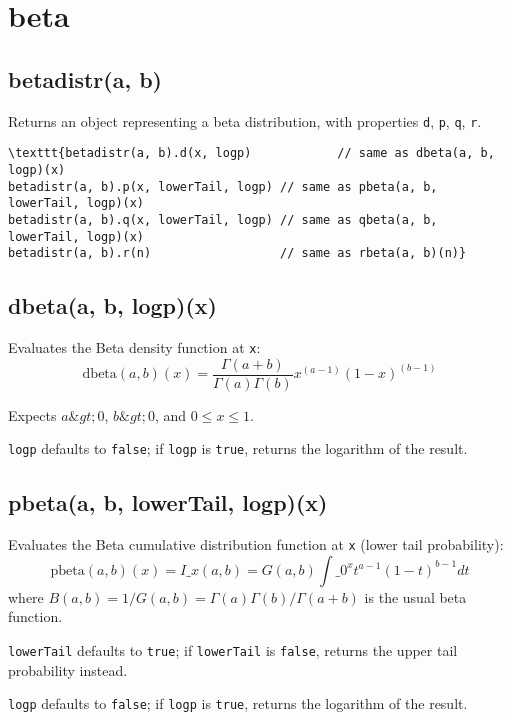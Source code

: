 \documentclass{article}
\begin{document}
  \section{beta}
    \subsection*{betadistr(a, b)}
    Returns an object representing a beta distribution, with properties \texttt{d}, \texttt{p}, \texttt{q}, \texttt{r}.


\begin{lstlisting}
\texttt{betadistr(a, b).d(x, logp)            // same as dbeta(a, b, logp)(x)
betadistr(a, b).p(x, lowerTail, logp) // same as pbeta(a, b, lowerTail, logp)(x)
betadistr(a, b).q(x, lowerTail, logp) // same as qbeta(a, b, lowerTail, logp)(x)
betadistr(a, b).r(n)                  // same as rbeta(a, b)(n)}\end{lstlisting}

    \subsection*{dbeta(a, b, logp)(x)}
    Evaluates the Beta density function at \texttt{x}:
$$\textrm{dbeta}(a,b)(x) = \frac{\Gamma(a+b)}{\Gamma(a)\Gamma(b)}x^{(a-1)}(1-x)^{(b-1)}$$


Expects $a \&gt; 0$, $b \&gt; 0$, and $0 \leq x \leq 1$.


\texttt{logp} defaults to \texttt{false}; if \texttt{logp} is \texttt{true}, returns the
logarithm of the result.


    \subsection*{pbeta(a, b, lowerTail, logp)(x)}
    Evaluates the Beta cumulative distribution
function at \texttt{x} (lower tail probability):
$$\textrm{pbeta}(a, b)(x) = I\_x(a, b)=G(a,b)\int\_0^xt^{a-1}(1-t)^{b-1}dt$$
where $B(a,b)=1/G(a,b) = \Gamma(a)\Gamma(b)/\Gamma(a+b)$ is the
usual beta function.


\texttt{lowerTail} defaults to \texttt{true}; if \texttt{lowerTail} is \texttt{false}, returns
the upper tail probability instead.


\texttt{logp} defaults to \texttt{false}; if \texttt{logp} is \texttt{true}, returns the logarithm
of the result.
\end{document}

